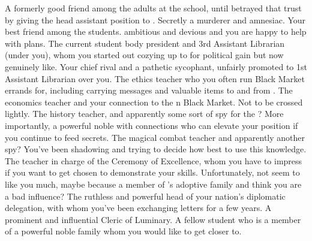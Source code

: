 \documentclass[char]{GL2020}
\begin{document}
\begin{contacts}
    \contact{\cLibrarian{}} A formerly good friend among the adults at the school, until \cLibrarian{\they} betrayed that trust by giving the head assistant position to \cAmbition{}. Secretly a murderer and amnesiac.
    \contact{\cAdopted{}} Your best friend among the students. \cAdopted{\Theyare} ambitious and devious and you are happy to help \cAdopted{\them} with \cAdopted{\their} plans.
    \contact{\cPresident{}} The current student body president and 3rd Assistant Librarian (under you), whom you started out cozying up to for political gain but now genuinely like.
    \contact{\cAmbition{}} Your chief rival and a pathetic sycophant, unfairly promoted to 1st Assistant Librarian over you.
    \contact{\cEthics{}} The ethics teacher who you often run Black Market errands for, including carrying messages and valuable items to and from \cChupSecond{}.
    \contact{\cChupSecond{}} The economics teacher and your connection to the \pEarth{}n Black Market. Not to be crossed lightly. 
    \contact{\cHistory{}} The history teacher, and apparently some sort of spy for the \pFarm{}? More importantly, a powerful noble with connections who can elevate your position if you continue to feed \cHistory{\them} secrets.
    \contact{\cInterpol{}} The magical combat teacher and apparently another spy? You've been shadowing \cInterpol{} and trying to decide how best to use this knowledge. 
    \contact{\cMusic{}} The teacher in charge of the Ceremony of Excellence, whom you have to impress if you want to get chosen to demonstrate your skills. Unfortunately, \cMusic{\theydo} not seem to like you much, maybe because \cMusic{\theyare} a member of \cAdopted{}’s adoptive family and think\cMusic{\verbs} you are a bad influence?
    \contact{\cEvil{}} The ruthless and powerful head of your nation’s diplomatic delegation, with whom you’ve been exchanging letters for a few years.
    \contact{\cHedonist{}} A prominent and influential Cleric of Luminary.
    \contact{\cChupStudent{}} A fellow student who is a member of a powerful noble family whom you would like to get closer to.
\end{contacts}
\end{document}
